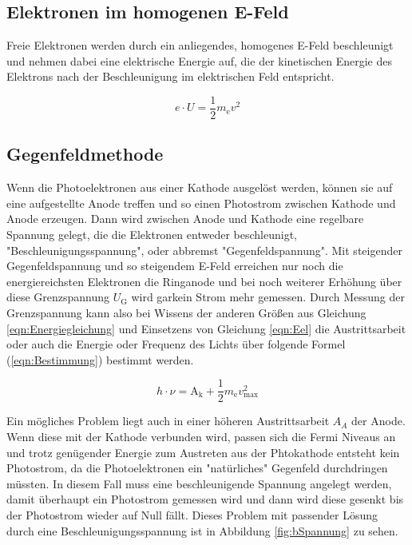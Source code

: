 \documentclass[titlepage = firstcover]{scrartcl}
\begin{document}
        \subsection{Elektronen im homogenen E-Feld}
        Freie Elektronen werden durch ein anliegendes, homogenes E-Feld beschleunigt und nehmen dabei eine elektrische Energie auf, die der kinetischen Energie des Elektrons nach der Beschleunigung
        im elektrischen Feld entspricht.

        \begin{equation}
            e \cdot U = \frac{1}{2} m_{\text{e}}v^2
            \label{eqn:Eel}
        \end{equation}

        \subsection{Gegenfeldmethode}
        Wenn die Photoelektronen aus einer Kathode ausgelöst werden, können sie auf eine aufgestellte Anode treffen und so einen Photostrom zwischen Kathode und Anode erzeugen. Dann wird zwischen
        Anode und Kathode eine regelbare Spannung gelegt, die die Elektronen entweder beschleunigt, "Beschleunigungsspannung", oder abbremst "Gegenfeldspannung". Mit steigender Gegenfeldspannung und 
        so steigendem E-Feld erreichen nur noch die energiereichsten Elektronen die Ringanode und bei noch weiterer Erhöhung über diese Grenzspannung $U_{\text{G}}$ wird garkein Strom mehr gemessen. 
        Durch Messung der Grenzspannung kann also bei Wissens der anderen Größen aus Gleichung \ref{eqn:Energiegleichung} und Einsetzens von Gleichung \ref{eqn:Eel} die Austrittsarbeit oder auch die 
        Energie oder Frequenz des Lichts über folgende Formel (\ref{eqn:Bestimmung}) bestimmt werden.

        \begin{equation}
          h \cdot \nu = \text{A}_{\text{k}} + \frac{1}{2} m_{\text{e}}v_{\text{max}}^2
          \label{eqn:Bestimmung}
        \end{equation}
        
        \noindent
        Ein mögliches Problem liegt auch in einer höheren Austrittsarbeit $A_A$ der Anode. Wenn diese mit der Kathode verbunden wird, passen sich die Fermi Niveaus an und trotz genügender Energie zum 
        Austreten aus der Phtokathode entsteht kein Photostrom, da die Photoelektronen ein "natürliches" Gegenfeld durchdringen müssten. In diesem Fall muss eine beschleunigende Spannung angelegt 
        werden, damit überhaupt ein Photostrom gemessen wird und dann wird diese gesenkt bis der Photostrom wieder auf Null fällt. Dieses Problem mit passender Lösung durch eine Beschleunigungsspannung
        ist in Abbildung \ref{fig:bSpannung} zu sehen.  
\end{document}
